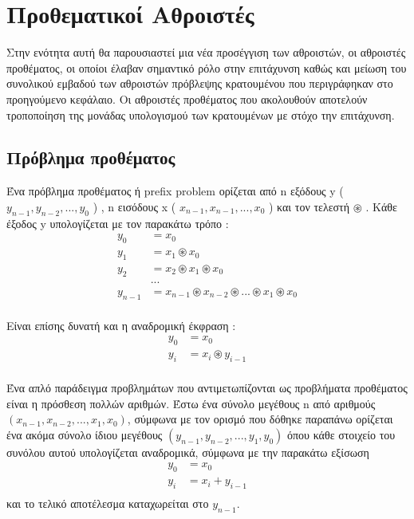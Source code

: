 \section{Προθεματικοί Αθροιστές}
Στην ενότητα αυτή θα παρουσιαστεί μια νέα προσέγγιση των αθροιστών, οι αθροιστές προθέματος,
οι οποίοι έλαβαν σημαντικό ρόλο στην επιτάχυνση καθώς και μείωση του συνολικού εμβαδού 
των αθροιστών πρόβλεψης κρατουμένου που περιγράφηκαν στο προηγούμενο κεφάλαιο. Οι αθροιστές προθέματος που ακολουθούν αποτελούν τροποποίηση της μονάδας υπολογισμού των κρατουμένων με στόχο την επιτάχυνση.





\subsection{Πρόβλημα προθέματος}

Ένα πρόβλημα προθέματος ή prefix problem
ορίζεται από n εξόδους y ( $y_{n-1},y_{n-2}, ... ,y_0 $ ) , n εισόδους x ( $x_{n-1},x_{n-1}, ... ,x_0 $ ) και τον τελεστή $\circledast$ .
Κάθε έξοδος y υπολογίζεται με τον παρακάτω τρόπο :
\begin{equation}
\begin{split}
y_0 &= x_0\\
y_1 &= x_1 \circledast x_0\\
y_2 &= x_2 \circledast x_1 \circledast x_0\\
&...\\
y_{n-1} &= x_{n-1} \circledast x_{n-2} \circledast ... \circledast x_{1} \circledast x_0\\
\end{split}
\end{equation}

Είναι επίσης δυνατή και η αναδρομική έκφραση :
\begin{equation}
\begin{split}
y_0 &= x_0\\
y_{i} &= x_{i} \circledast y_{i-1}\\
\end{split}
\end{equation}

Ένα απλό παράδειγμα προβλημάτων που αντιμετωπίζονται ως προβλήματα προθέματος είναι 
η πρόσθεση πολλών αριθμών. Έστω ένα σύνολο μεγέθους n από αριθμούς 
$(x_{n-1},x_{n-2}, ... ,x_1,x_0)$, σύμφωνα με τον ορισμό που δόθηκε παραπάνω
ορίζεται ένα ακόμα σύνολο ίδιου μεγέθους $(y_{n-1},y_{n-2}, ... ,y_1,y_0)$ 
όπου κάθε στοιχείο του συνόλου αυτού υπολογίζεται αναδρομικά, σύμφωνα με την παρακάτω εξίσωση
\begin{equation*}
\begin{split}
y_0 &= x_0\\
y_{i} &= x_{i} + y_{i-1}\\
\end{split}
\end{equation*}
και το τελικό αποτέλεσμα καταχωρείται στο $y_{n-1}$.

